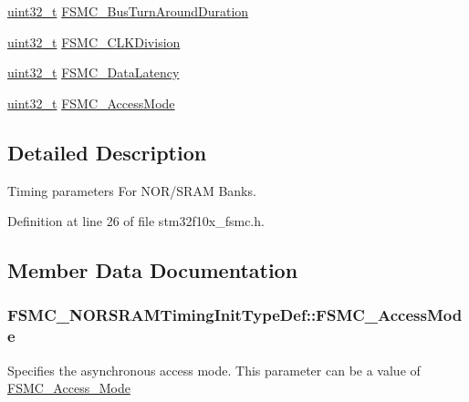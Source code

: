 \begin{DoxyCompactItemize}
\item 
\hyperlink{_p_e___types_8h_a33594304e786b158f3fb30289278f5af}{uint32\+\_\+t} \hyperlink{struct_f_s_m_c___n_o_r_s_r_a_m_timing_init_type_def_a3d98d57618e46ec6aa5d876dcc047d32}{F\+S\+M\+C\+\_\+\+Bus\+Turn\+Around\+Duration}
\item 
\hyperlink{_p_e___types_8h_a33594304e786b158f3fb30289278f5af}{uint32\+\_\+t} \hyperlink{struct_f_s_m_c___n_o_r_s_r_a_m_timing_init_type_def_a251b439331b82eecea58aa3f8882ea15}{F\+S\+M\+C\+\_\+\+C\+L\+K\+Division}
\item 
\hyperlink{_p_e___types_8h_a33594304e786b158f3fb30289278f5af}{uint32\+\_\+t} \hyperlink{struct_f_s_m_c___n_o_r_s_r_a_m_timing_init_type_def_abc33886615fc3627448aa2dba11cfc77}{F\+S\+M\+C\+\_\+\+Data\+Latency}
\item 
\hyperlink{_p_e___types_8h_a33594304e786b158f3fb30289278f5af}{uint32\+\_\+t} \hyperlink{struct_f_s_m_c___n_o_r_s_r_a_m_timing_init_type_def_a261d043a19cecf77e6859403be204efc}{F\+S\+M\+C\+\_\+\+Access\+Mode}
\end{DoxyCompactItemize}


\subsection{Detailed Description}
Timing parameters For N\+O\+R/\+S\+R\+AM Banks. 

Definition at line 26 of file stm32f10x\+\_\+fsmc.\+h.



\subsection{Member Data Documentation}
\subsubsection[{\texorpdfstring{F\+S\+M\+C\+\_\+\+Access\+Mode}{FSMC_AccessMode}}]{ F\+S\+M\+C\+\_\+\+N\+O\+R\+S\+R\+A\+M\+Timing\+Init\+Type\+Def\+::\+F\+S\+M\+C\+\_\+\+Access\+Mode}\hypertarget{struct_f_s_m_c___n_o_r_s_r_a_m_timing_init_type_def_a101b772eba1960ec456418228a6172d8}{}\label{struct_f_s_m_c___n_o_r_s_r_a_m_timing_init_type_def_a101b772eba1960ec456418228a6172d8}
Specifies the asynchronous access mode. This parameter can be a value of \hyperlink{group___f_s_m_c___access___mode}{F\+S\+M\+C\+\_\+\+Access\+\_\+\+Mode} 

